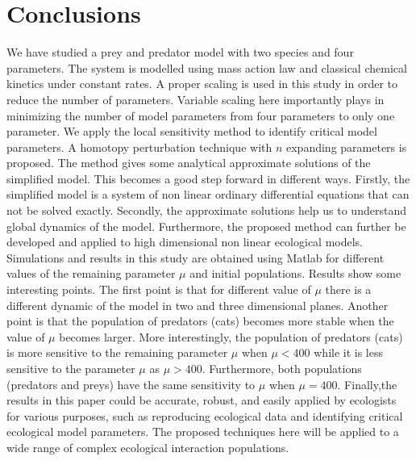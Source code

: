 \documentclass[a4paper,12pt]{article}
\begin{document}
\section{Conclusions} 
We have studied a prey and predator model with two species and four parameters. The system is modelled using mass action law and classical chemical kinetics under constant rates. A proper scaling is used in this study in order to reduce the number of parameters. Variable scaling here importantly plays in minimizing the number of model parameters from four parameters to only one parameter. We apply the local sensitivity method to identify critical model parameters. A homotopy perturbation technique with $n$ expanding parameters is proposed. The method gives some analytical approximate solutions of the simplified model. This becomes a good step forward in different ways. Firstly, the simplified model is a system of non linear ordinary differential equations that can not be solved exactly. Secondly, the approximate solutions help us to understand global dynamics of the model. Furthermore, the proposed method can further be developed and applied to high dimensional non linear ecological models. \\
 
\noindent Simulations and results in this study are obtained using Matlab for different values of the remaining parameter $\mu$ and initial populations. Results show some interesting points. The first point is that for different value of $\mu$ there is a different dynamic of the model in two and three dimensional planes. Another point is that the population of predators (cats) becomes more stable when the value of $\mu$ becomes larger. More interestingly, the population of predators (cats) is more sensitive to the remaining parameter $\mu$ when $\mu < 400$ while it is less sensitive to the parameter $\mu$ as $\mu > 400$. Furthermore, both populations (predators and preys) have the same sensitivity to $\mu$ when $\mu=400$.
Finally,the results in this paper could be accurate, robust, and easily applied by ecologists for various purposes, such as reproducing ecological data and identifying critical ecological model parameters. The proposed techniques here will be applied to a wide range of complex ecological interaction populations.                 


\end{document}

